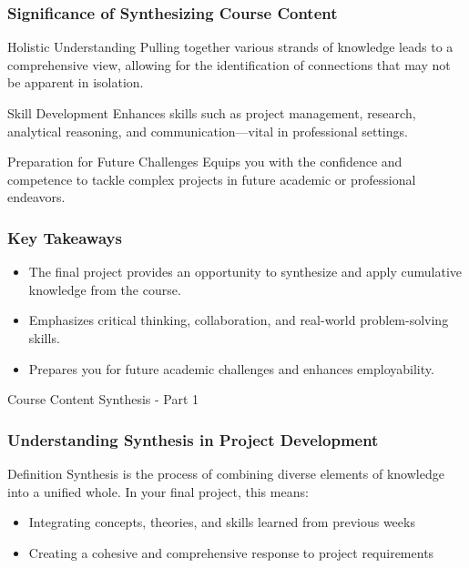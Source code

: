 \documentclass[aspectratio=169]{beamer}
\begin{document}
\begin{frame}[fragile]
    \frametitle{Significance of Synthesizing Course Content}
    
    \begin{block}{Holistic Understanding}
        Pulling together various strands of knowledge leads to a comprehensive view, allowing for the identification of connections that may not be apparent in isolation.
    \end{block}
    
    \begin{block}{Skill Development}
        Enhances skills such as project management, research, analytical reasoning, and communication—vital in professional settings.
    \end{block}
    
    \begin{block}{Preparation for Future Challenges}
        Equips you with the confidence and competence to tackle complex projects in future academic or professional endeavors.
    \end{block}
\end{frame}

\begin{frame}[fragile]
    \frametitle{Key Takeaways}
    
    \begin{itemize}
        \item The final project provides an opportunity to synthesize and apply cumulative knowledge from the course.
        \item Emphasizes critical thinking, collaboration, and real-world problem-solving skills.
        \item Prepares you for future academic challenges and enhances employability.
    \end{itemize}
\end{frame}

\begin{frame}[fragile]{Course Content Synthesis - Part 1}
  \frametitle{Understanding Synthesis in Project Development}
  \begin{block}{Definition}
    Synthesis is the process of combining diverse elements of knowledge into a unified whole. In your final project, this means:
  \end{block}
  \begin{itemize}
    \item Integrating concepts, theories, and skills learned from previous weeks
    \item Creating a cohesive and comprehensive response to project requirements
  \end{itemize}
\end{frame}
\end{document}

